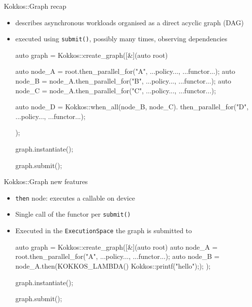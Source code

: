 


\begin{frame}[fragile]{Kokkos::Graph recap}
 \begin{itemize}
     \item describes asynchronous workloads organised as a direct acyclic graph (DAG)
     \item executed using \texttt{submit()}, possibly many times, observing dependencies
      \begin{code}[keywords={auto}]
auto graph = Kokkos::create_graph([&](auto root) {
    auto node_A = root.then_parallel_for("A", ...policy..., ...functor...);
    auto node_B = node_A.then_parallel_for("B", ...policy..., ...functor...);
    auto node_C = node_A.then_parallel_for("C", ...policy..., ...functor...);

    auto node_D = Kokkos::when_all(node_B, node_C).
                  then_parallel_for("D", ...policy..., ...functor...);
});

graph.instantiate();

graph.submit();
      \end{code}
 \end{itemize}
\end{frame}

\begin{frame}[fragile]{Kokkos::Graph new features}
 \begin{itemize}
  \item \texttt{then} node: executes a callable on device
  \item Single call of the functor per \texttt{submit()}
   \item Executed in the \texttt{ExecutionSpace} the graph is submitted to
     \begin{code}[keywords={auto}]
auto graph = Kokkos::create_graph([&](auto root) {
    auto node_A = root.then_parallel_for("A", ...policy..., ...functor...);
    auto node_B = node_A.then(KOKKOS_LAMBDA(){ Kokkos::printf("hello\n");});
});

graph.instantiate();

graph.submit();
     \end{code}
 \end{itemize}
\end{frame}

